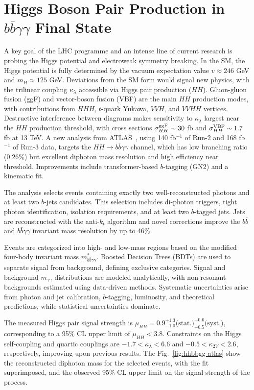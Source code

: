 \documentclass[a4paper,11pt]{article}
\begin{document}
\section{Higgs Boson Pair Production in $b\bar{b}\gamma\gamma$ Final State}

A key goal of the LHC programme and an intense line of current
research is probing the Higgs potential and electroweak symmetry
breaking.  In the SM, the Higgs potential is fully determined by the
vacuum expectation value $v\approx246$ GeV and $m_H\approx125$ GeV.
Deviations from the SM form would signal new physics, with the
trilinear coupling $\kappa_\lambda$ accessible via Higgs pair
production ($HH$).  Gluon-gluon fusion (ggF) and vector-boson fusion
(VBF) are the main $HH$ production modes, with contributions from
$HHH$, $t$-quark Yukawa, $VVH$, and $VVHH$ vertices.  Destructive
interference between diagrams makes sensitivity to $\kappa_\lambda$
largest near the $HH$ production threshold, with cross sections
$\sigma_{HH}^{\rm ggF}\sim30$ fb and $\sigma_{HH}^{\rm VBF}\sim1.7$ fb
at 13 TeV.  A new analysis from ATLAS~\cite{hhbbgg-atlas}, using 140
fb$^{-1}$ of Run-2 and 168 fb$^{-1}$ of Run-3 data, targets the $HH\to
b\bar{b}\gamma\gamma$ channel, which has low branching ratio (0.26\%)
but excellent diphoton mass resolution and high efficiency near
threshold.  Improvements include transformer-based $b$-tagging (GN2)
and a kinematic fit.

The analysis selects events containing exactly two well-reconstructed
photons and at least two $b$-jets candidates.  This selection includes
di-photon triggers, tight photon identification, isolation
requirements, and at least two $b$-tagged jets. Jets are reconstructed
with the anti-$k_t$ algorithm and novel corrections improve the $b\bar{b}$ and
$b\bar{b}\gamma\gamma$ invariant mass resolution by up to 46\%.

Events are categorized into high- and low-mass regions based on the
modified four-body invariant mass
$m^*_{b\bar{b}\gamma\gamma}$. Boosted Decision Trees (BDTs) are used
to separate signal from background, defining exclusive
categories. Signal and background $m_{\gamma\gamma}$ distributions are
modeled analytically, with non-resonant backgrounds estimated using
data-driven methods. Systematic uncertainties arise from photon and
jet calibration, $b$-tagging, luminosity, and theoretical predictions,
while statistical uncertainties dominate.

The measured Higgs pair signal strength is
$\mu_{HH}=0.9^{+1.3}_{-1.0}\text{(stat.)}^{+0.6}_{-0.5}\text{(syst.)}$,
corresponding to a 95\% CL upper limit of $\mu_{HH}<3.8$. Constraints
on the Higgs self-coupling and quartic couplings are $-1.7 <
\kappa_\lambda < 6.6$ and $-0.5 < \kappa_{2V} < 2.6$, respectively,
improving upon previous results. The Fig.~\ref{fig:hhbbgg-atlas} show
the reconstructed diphoton mass for the selected events, with the fit
superimposed, and the observed 95\% CL upper limit on the signal
strength of the process.
\end{document}
